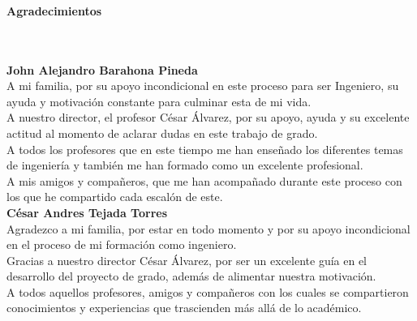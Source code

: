 \newpage{\pagestyle{empty}\cleardoublepage}

\newpage
\thispagestyle{empty} \textbf{}\normalsize
\\\\\\%
\textbf{\LARGE Agradecimientos}
\\\\

\textbf{John Alejandro Barahona Pineda}\\

A mi familia, por su apoyo incondicional en este proceso para ser Ingeniero, su ayuda y motivación constante para culminar esta de mi vida.\\

A nuestro director, el profesor César Álvarez, por su apoyo, ayuda y su excelente actitud al momento de aclarar dudas en este trabajo de grado.\\

A todos los profesores que en este tiempo me han enseñado los diferentes temas de ingeniería y también me han formado como un excelente profesional.\\

A mis amigos y compañeros, que me han acompañado durante este proceso con los que he compartido cada escalón de este.\\ [2cm]

\textbf{César Andres Tejada Torres}\\

Agradezco a mi familia, por estar en todo momento y por su apoyo incondicional en el proceso de mi formación como ingeniero. \\

Gracias a nuestro director César Álvarez, por ser un excelente guía en el desarrollo del proyecto de grado, además de alimentar nuestra motivación.\\

A todos aquellos profesores, amigos y compañeros con los cuales se compartieron conocimientos y experiencias que trascienden más allá de lo académico. \\

\newpage{\pagestyle{empty}\cleardoublepage}